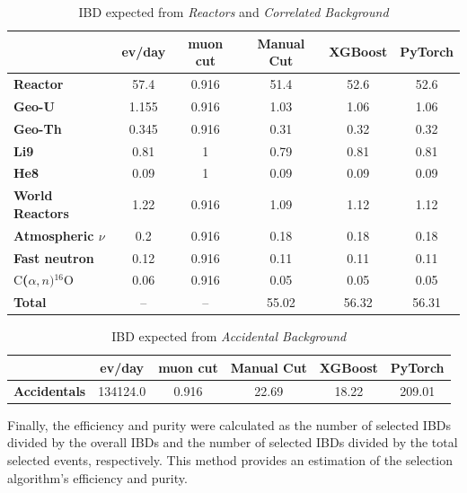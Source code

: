 \begin{table}[h]
	\centering
	\begin{tabular}{lcc|ccc}
		\toprule
		& \textbf{ev/day} & \textbf{muon cut} & \textbf{Manual Cut} & \textbf{XGBoost} & \textbf{PyTorch} \\
		\midrule
		\textbf{Reactor} & 57.4 & 0.916 & 51.4 & 52.6 & 52.6 \\
		\midrule
		\textbf{Geo-U} & 1.155 & 0.916 & 1.03 & 1.06 & 1.06 \\
		\textbf{Geo-Th} & 0.345 & 0.916 & 0.31 & 0.32 & 0.32 \\
		\textbf{Li9} & 0.81 & 1 & 0.79 & 0.81 & 0.81 \\
		\textbf{He8} & 0.09 & 1 & 0.09 & 0.09 & 0.09 \\
		\textbf{World Reactors} & 1.22 & 0.916 & 1.09 & 1.12 & 1.12 \\
		\textbf{Atmospheric $\nu$} & 0.2 & 0.916 & 0.18 & 0.18 & 0.18 \\
		\textbf{Fast neutron} & 0.12 & 0.916 & 0.11 & 0.11 & 0.11 \\
		\textbf{$\mathrm{C}$($\alpha,n)$$^{16}\mathrm{O}$} & 0.06 & 0.916 & 0.05 & 0.05 & 0.05 \\
		\textbf{Total} & -- & -- & 55.02 & 56.32 & 56.31 \\
		\bottomrule
	\end{tabular}
	\caption{IBD expected from \textit{Reactors} and \textit{Correlated Background}}
	\label{tab:correlated}
\end{table}

\begin{table}[h]
	\centering
	\begin{tabular}{lcc|ccc}
		\toprule
		& \textbf{ev/day} & \textbf{muon cut} & \textbf{Manual Cut} & \textbf{XGBoost} & \textbf{PyTorch} \\
		\midrule
		\textbf{Accidentals} & 134124.0 & 0.916 & 22.69 & 18.22 & 209.01 \\
		\bottomrule
	\end{tabular}
	\caption{IBD expected from \textit{Accidental Background}}
	\label{tab:accidentals}
\end{table}
	




Finally, the efficiency and purity were calculated as the number of selected IBDs divided by the overall IBDs and the number of selected IBDs divided by the total selected events, respectively. This method provides an estimation of the selection algorithm's efficiency and purity.

